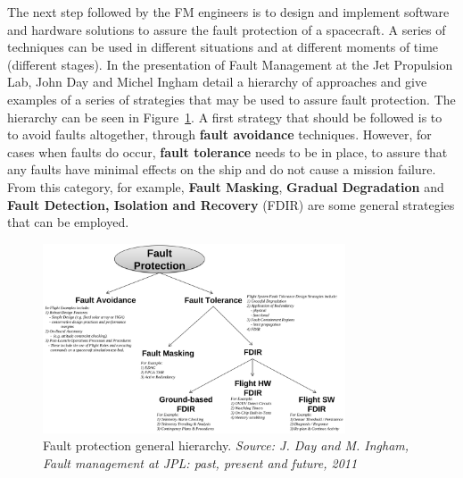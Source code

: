 The next step followed by the FM engineers is to design and implement software
and hardware solutions to assure the fault protection of a spacecraft. A series
of techniques can be used in different situations and at different moments of
time (different stages). In the presentation of Fault Management at the Jet
Propulsion Lab\cite{fm-jpl}, John Day and Michel Ingham detail a hierarchy of
approaches and give examples of a series of strategies that may be used to
assure fault protection. The hierarchy can be seen in
Figure~\ref{fig:fault_protection_hierarchy}. A first strategy that should be
followed is to to avoid faults altogether, through \textbf{fault avoidance}
techniques. However, for cases when faults do occur, \textbf{fault tolerance}
needs to be in place, to assure that any faults have minimal effects on the ship
and do not cause a mission failure. From this category, for example,
\textbf{Fault Masking}, \textbf{Gradual Degradation} and \textbf{Fault
Detection, Isolation and Recovery} (FDIR) are some general strategies that can
be employed.

\begin{figure}[htb]
	\begin{center}
	\includegraphics[width=0.8\textwidth]{img/fault_protection_hierarchy.png}
	\caption{Fault protection general hierarchy. \small{\textit{Source: J.
	Day and M. Ingham, Fault management at JPL: past, present and future, 2011}}}
	\label{fig:fault_protection_hierarchy}
	\end{center}
\end{figure}


